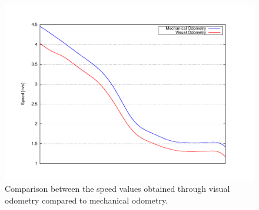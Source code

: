 \begin{figure}[th]
  \centering
  \includegraphics[trim=50 50 90 60, clip]{speed}
  \caption{Comparison between the speed values obtained through visual odometry compared to mechanical odometry.}\label{fig:cp05_ego_speed}
\end{figure}

